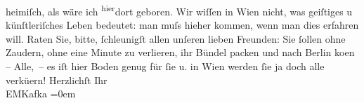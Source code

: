 \begin{ledgroupsized}[t]{13cm}
                    heimiſch, als wäre {\pb}ich \substVorne{}\textsuperscript{hier}\substDazwischen{}dort\substHinten{} geboren. Wir wiſſen in Wien nicht, was
                    geiſtiges u künſtleriſches Leben bedeutet: man muſs hieher kommen, wenn man dies
                    erfahren will.\pend
           \pstart
           Raten Sie, bitte, ſchleunigſt allen unſeren lieben Freunden: Sie ſollen ohne
                    Zaudern, ohne eine Minute zu verlieren, ihr Bündel packen und nach Berlin ko{\geminationm}en –
                    Alle, – es iſt hier Boden genug für ſie u. in Wien werden ſie \introOben{}ja\introOben{} doch alle verkü{\geminationm}ern! \pend
           \pstart
           Herzlichſt Ihr{\\[\baselineskip]}EMKafka\pend
           \leftskip=0em{}\pstart
           \noindent{}\label{T_L00158_1v}\label{T_L00158_1h}\pend
           \endnumbering{}\end{ledgroupsized}  \newcommand{\dateiname}{L00158}\newcommand{\titel}{Eduard Michael Kafka an Arthur Schnitzler, 12. 1. 1893}\newcommand{\editorInnen}{Martin Anton Müller und Gerd-Hermann Susen}
      